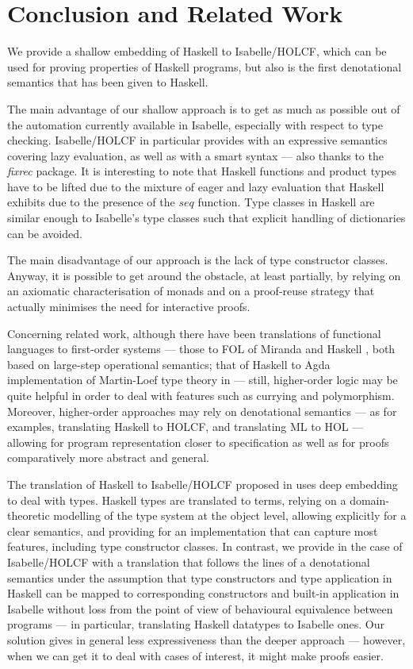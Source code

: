 \documentclass{llncs}
\begin{document}
\section{Conclusion and Related Work}
\label{sec:conclusion}

We provide a shallow embedding of Haskell to Isabelle/HOLCF,
which can be used for proving properties of Haskell programs,
but also is the first denotational semantics that has been
given to Haskell.

The main advantage of our shallow approach is to get as much as
possible out of the automation currently available in Isabelle,
especially with respect to type checking. Isabelle/HOLCF in particular
provides with an expressive semantics covering lazy evaluation, as
well as with a smart syntax --- also thanks to the \emph{fixrec}
package. It is interesting to note that Haskell functions and product
types have to be lifted due to the mixture of eager and lazy evaluation
that Haskell exhibits due to the presence of the $seq$ function.
Type classes in Haskell are similar enough to Isabelle's type classes
such that explicit handling of dictionaries can be avoided.

The main disadvantage of our approach is the lack of type
constructor classes. Anyway, it is possible to get around the
obstacle, at least partially, by relying on an axiomatic
characterisation of monads and on a proof-reuse strategy that actually
minimises the need for interactive proofs.

Concerning related work, although there have been translations of
functional languages to first-order systems --- those to FOL of
Miranda \cite{Thompson95,Thompson89,Thompson95b} and Haskell
\cite{Thompson92}, both based on large-step operational semantics;
that of Haskell to Agda implementation of Martin-Loef type theory in
\cite{Abel} --- still, higher-order logic may be quite helpful in
order to deal with features such as currying and polymorphism.
Moreover, higher-order approaches may rely on denotational semantics
--- as for examples, \cite{Huff} translating Haskell to HOLCF, and
\cite{Pollack} translating ML to HOL --- allowing for program
representation closer to specification as well as for proofs
comparatively more abstract and general.

The translation of Haskell to Isabelle/HOLCF proposed in \cite{Huff}
uses deep embedding to deal with types.  Haskell types are translated
to terms, relying on a domain-theoretic modelling of the type system
at the object level, allowing explicitly for a clear semantics, and
providing for an implementation that can capture most features,
including type constructor classes.  In contrast, we provide in the
case of Isabelle/HOLCF with a translation that follows the lines of a
denotational semantics under the assumption that type constructors and
type application in Haskell can be mapped to corresponding
constructors and built-in application in Isabelle without loss from
the point of view of behavioural equivalence between programs --- in
particular, translating Haskell datatypes to Isabelle ones.  Our
solution gives in general less expressiveness than the deeper approach
--- however, when we can get it to deal with cases of interest, it
might make proofs easier.
\end{document}
